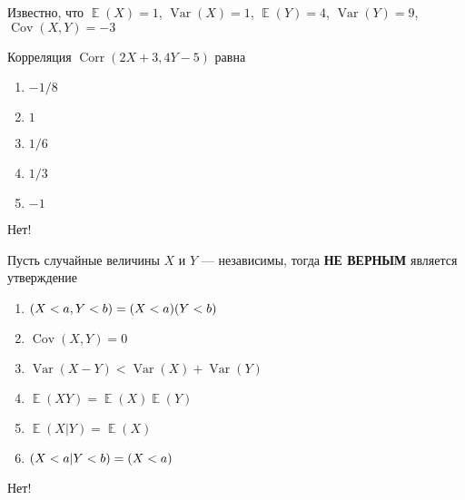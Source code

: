 \documentclass[t]{beamer}
\DeclareMathOperator{\Var}{Var}
\DeclareMathOperator{\Cov}{Cov}
\DeclareMathOperator{\Corr}{Corr}
\DeclareMathOperator{\E}{\mathbb{E}}
\let\P\relax
\DeclareMathOperator{\P}{\mathbb{P}}
\begin{document}
 \begin{frame} \label{25-No} 
\begin{block}{25} 

Известно, что $\E(X)=1$, $\Var(X)=1$, $\E(Y)=4$, $\Var(Y)=9$, $\Cov(X,Y)=-3$

\vspace{0.5cm} 
 
 
Корреляция $\Corr(2X+3,4Y-5)$ равна
 


 \end{block} 
\begin{enumerate} 
\item[] \hyperlink{25-No}{\beamergotobutton{} $-1/8$}
\item[] \hyperlink{25-No}{\beamergotobutton{} $1$}
\item[] \hyperlink{25-No}{\beamergotobutton{} $1/6$
}
\item[] \hyperlink{25-No}{\beamergotobutton{} $1/3$}
\item[] \hyperlink{25-Yes}{\beamergotobutton{} $-1$}
\end{enumerate} 

 \alert{Нет!} 
\end{frame} 


 \begin{frame} \label{26-No} 
\begin{block}{26} 

Пусть случайные величины $X$ и $Y$ — независимы, тогда \textbf{НЕ ВЕРНЫМ} является утверждение
 


 \end{block} 
\begin{enumerate} 
\item[] \hyperlink{26-No}{\beamergotobutton{} $\P(X<a, Y<b)=\P(X<a)\P(Y<b)$}
\item[] \hyperlink{26-No}{\beamergotobutton{} $\Cov(X,Y) = 0$}
\item[] \hyperlink{26-Yes}{\beamergotobutton{} $\Var(X-Y)<\Var(X)+\Var(Y)$ }
\item[] \hyperlink{26-No}{\beamergotobutton{} $\E(XY)=\E(X)\E(Y)$}
\item[] \hyperlink{26-No}{\beamergotobutton{} $\E(X|Y)=\E(X)$}
\item[] \hyperlink{26-No}{\beamergotobutton{} $\P(X<a | Y<b)=\P(X<a)$}
\end{enumerate} 

 \alert{Нет!} 
\end{frame} 
\end{document}

